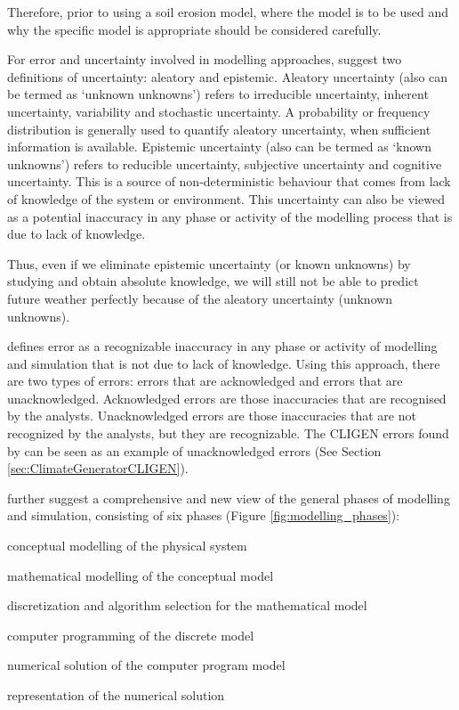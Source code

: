 Therefore, prior to using a soil erosion model, where the model is to be
used and why the specific model is appropriate should be considered carefully.

For error and uncertainty involved in modelling approaches,
\citet{oberkampf2002-333} suggest two definitions of uncertainty: aleatory and
epistemic.
Aleatory uncertainty (also can be termed as `unknown unknowns') refers to
irreducible uncertainty, inherent uncertainty, variability and stochastic
uncertainty. A probability or frequency distribution is generally used to
quantify aleatory uncertainty, when sufficient information
is available.
Epistemic uncertainty (also can be termed as `known unknowns') refers to
reducible uncertainty, subjective uncertainty and cognitive uncertainty. This is
a source of non-deterministic behaviour that comes from lack of knowledge of the
system or environment. This uncertainty can also be viewed as a potential
inaccuracy in any phase or activity of the modelling process that is due to lack
of knowledge.

Thus, even if we eliminate epistemic uncertainty (or known unknowns) by studying
and obtain absolute knowledge, we will still not be able to predict future
weather perfectly because of the aleatory uncertainty (unknown unknowns).

\citet{oberkampf2002-333} defines error as a recognizable inaccuracy in any
phase or activity of modelling and simulation that is not due to lack of
knowledge. Using this approach, there are two types of errors: errors that are
acknowledged and errors that are unacknowledged. Acknowledged errors are
those inaccuracies that are recognised by the analysts. Unacknowledged errors
are those inaccuracies that are not recognized by the analysts, but they are
recognizable. The CLIGEN errors found by \citet{yu2000-301} can be seen as an
example of unacknowledged errors (See Section \ref{sec:ClimateGeneratorCLIGEN}).

\citet{oberkampf2002-333} further suggest a comprehensive and new view of the
general phases of modelling and simulation, consisting of six phases (Figure
\ref{fig:modelling_phases}):
\begin{enumerate*}
  \item conceptual modelling of the physical system
  \item mathematical modelling of the conceptual model
  \item discretization and algorithm selection for the mathematical model
  \item computer programming of the discrete model
  \item numerical solution of the computer program model
  \item representation of the numerical solution
\end{enumerate*}

